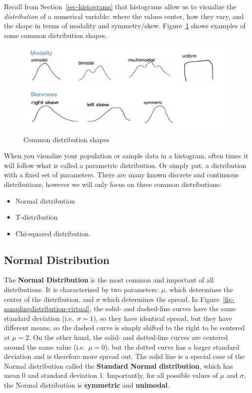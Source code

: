 \documentclass[
  letterpaper,
  DIV=11,
  numbers=noendperiod]{scrreprt}
\providecommand{\tightlist}{%
  \setlength{\itemsep}{0pt}\setlength{\parskip}{0pt}}\usepackage{longtable,booktabs,array}
\theoremstyle{definition}
\theoremstyle{remark}
\begin{document}
Recall from Section~\ref{sec-histograms} that histograms allow us to
visualize the \emph{distribution} of a numerical variable: where the
values center, how they vary, and the shape in terms of modality and
symmetry/skew. Figure~\ref{fig-distribution} shows examples of some
common distribution shapes.

\begin{figure}

{\centering \includegraphics{images/distribution.png}

}

\caption{\label{fig-distribution}Common distribution shapes}

\end{figure}

When you visualize your population or sample data in a histogram, often
times it will follow what is called a parametric distribution. Or simply
put, a distribution with a fixed set of parameters. There are many known
discrete and continuous distributions, however we will only focus on
three common distributions:

\begin{itemize}
\tightlist
\item
  Normal distribution
\item
  T-distribution
\item
  Chi-squared distribution.
\end{itemize}

\hypertarget{normal-distribution}{%
\subsection{Normal Distribution}\label{normal-distribution}}

The \textbf{Normal Distribution} is the most common and important of all
distributions. It is characterized by two parameters: \(\mu\), which
determines the center of the distribution, and \(\sigma\) which
determines the spread. In Figure~\ref{fig-samplingdistribution-virtual},
the solid- and dashed-line curves have the same standard deviation
(i.e.~\(\sigma = 1\)), so they have identical spread, but they have
different means, so the dashed curve is simply shifted to the right to
be centered at \(\mu = 2\). On the other hand, the solid- and
dotted-line curves are centered around the same value
(i.e.~\(\mu = 0\)), but the dotted curve has a larger standard deviation
and is therefore more spread out. The solid line is a special case of
the Normal distribution called the \textbf{Standard Normal
distribution}, which has mean 0 and standard deviation 1. Importantly,
for all possible values of \(\mu\) and \(\sigma\), the Normal
distribution is \textbf{symmetric} and \textbf{unimodal}.
\end{document}
